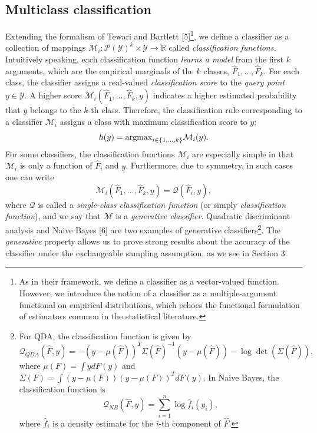 \documentclass[12pt]{article}
\begin{document}
\subsection{Multiclass classification}

Extending the formalism of Tewari and Bartlett [5]\footnote{As in their framework,
we define a classifier as a vector-valued function.  However, we introduce the notion of a classifier as a multiple-argument functional on empirical distributions, which echoes the functional formulation of estimators common in the statistical literature.},
we define a classifier as a collection of mappings
$\mathcal{M}_i: \mathcal{P}(\mathcal{Y})^k \times \mathcal{Y} \to \mathbb{R}$ called \emph{classification functions.}
Intuitively speaking, each classification function \emph{learns a model} from the first $k$ arguments, which are
the empirical marginals of the $k$ classes, $\hat{F}_1,\hdots, \hat{F}_k$.  For each class, the classifier assigns a real-valued \emph{classification score} to the \emph{query point} $y \in \mathcal{Y}$.  A higher score $\mathcal{M}_i(\hat{F}_1,\hdots, \hat{F}_k, y)$ indicates a higher estimated probability that $y$ belongs to the $k$-th class.  
Therefore, the classification rule corresponding to a classifier $\mathcal{M}_i$ assigns
a class with maximum classification score to $y$:
\[
h(y) = \text{argmax}_{i \in \{1,\hdots, k\}} \mathcal{M}_i(y).
\]
For some classifiers, the classification functions $\mathcal{M}_i$ are especially simple
in that $\mathcal{M}_i$ is only a function of $\hat{F}_i$ and $y$.
Furthermore, due to symmetry, in such cases one can write
\[
\mathcal{M}_i(\hat{F}_1,\hdots, \hat{F}_k, y) = \mathcal{Q}(\hat{F}_i, y),
\]
where $\mathcal{Q}$ is called a \emph{single-class classification function} (or simply \emph{classification function}),
and we say that $\mathcal{M}$ is a \emph{generative classifier}.
Quadratic discriminant analysis and Naive Bayes [6] are two examples of
generative classifiers\footnote{For QDA, the classification function is given by
\[
\mathcal{Q}_{QDA}(\hat{F}, y) = -(y - \mu(\hat{F}))^T \Sigma(\hat{F})^{-1} (y-\mu(\hat{F})) - \log\det(\Sigma(\hat{F})),
\]
where $\mu(F) = \int y dF(y)$ and $\Sigma(F) = \int (y-\mu(F))(y-\mu(F))^T dF(y)$.
In Naive Bayes, the classification function is
\[
\mathcal{Q}_{NB}(\hat{F},  y) = \sum_{i=1}^n \log \hat{f}_i(y_i),
\]
where $\hat{f}_i$ is a density estimate for the $i$-th component of
$\hat{F}$.}.
The \emph{generative} property allows us to prove strong results about the accuracy of the classifier
under the exchangeable sampling assumption, as we see in Section 3.
\end{document}
